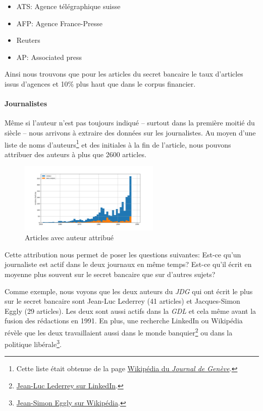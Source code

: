 \begin{itemize}
\tightlist
\item
  ATS: Agence télégraphique suisse
\item
  AFP: Agence France-Presse
\item
  Reuters
\item
  AP: Associated press
\end{itemize}

Ainsi nous trouvons que pour les articles du secret bancaire le taux
d'articles issus d'agences et 10\% plus haut que dans le corpus
financier.

\newpage

\hypertarget{journalistes}{%
\paragraph{Journalistes}\label{journalistes}}

Même si l'auteur n'est pas toujours indiqué -- surtout dans la première
moitié du siècle -- nous arrivons à extraire des données sur les
journalistes. Au moyen d'une liste de noms d'auteurs\footnote{Cette
  liste était obtenue de la page
  \href{https://fr.wikipedia.org/wiki/Journal_de_Gen\%C3\%A8ve}{Wikipédia
  du \emph{Journal de Genève}}.} et des initiales à la fin de l'article,
nous pouvons attribuer des auteurs à plus que 2600 articles.

\begin{figure}
\centering
\includegraphics[width=0.6\textwidth,height=\textheight]{author_attributed.png}
\caption{Articles avec auteur attribué}
\end{figure}

Cette attribution nous permet de poser les questions suivantes: Est-ce
qu'un journaliste est actif dans le deux journaux en même temps? Est-ce
qu'il écrit en moyenne plus souvent sur le secret bancaire que sur
d'autres sujets?

Comme exemple, nous voyons que les deux auteurs du \emph{JDG} qui ont
écrit le plus sur le secret bancaire sont Jean-Luc Lederrey (41
articles) et Jacques-Simon Eggly (29 articles). Les deux sont aussi
actifs dans la \emph{GDL} et cela même avant la fusion des rédactions en
1991. En plus, une recherche LinkedIn ou Wikipédia révèle que les deux
travaillaient aussi dans le monde banquier\footnote{\href{https://ch.linkedin.com/in/lederrey-jean-luc-1456b717}{Jean-Luc
  Lederrey sur LinkedIn}.} ou dans la politique libérale\footnote{\href{https://fr.wikipedia.org/wiki/Jacques-Simon_Eggly}{Jean-Simon
  Eggly sur Wikipédia}.}.

